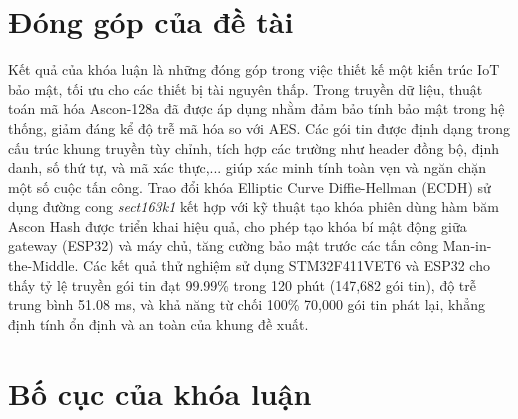 \section{Đóng góp của đề tài}
Kết quả của khóa luận là những đóng góp trong việc thiết kế một kiến trúc IoT bảo mật, tối ưu cho các thiết bị tài nguyên thấp. Trong truyền dữ liệu, thuật toán mã hóa Ascon-128a đã được áp dụng nhằm đảm bảo tính bảo mật trong hệ thống, giảm đáng kể độ trễ mã hóa so với AES. Các gói tin được định dạng trong cấu trúc khung truyền tùy chỉnh, tích hợp các trường như header đồng bộ, định danh, số thứ tự, và mã xác thực,... giúp xác minh tính toàn vẹn và ngăn chặn một số cuộc tấn công. Trao đổi khóa Elliptic Curve Diffie-Hellman (ECDH) sử dụng đường cong \textit{sect163k1} kết hợp với kỹ thuật tạo khóa phiên dùng hàm băm Ascon Hash được triển khai hiệu quả, cho phép tạo khóa bí mật động giữa gateway (ESP32) và máy chủ, tăng cường bảo mật trước các tấn công Man-in-the-Middle. Các kết quả thử nghiệm sử dụng STM32F411VET6 và ESP32 cho thấy tỷ lệ truyền gói tin đạt 99.99\% trong 120 phút (147,682 gói tin), độ trễ trung bình 51.08 ms, và khả năng từ chối 100\% 70,000 gói tin phát lại, khẳng định tính ổn định và an toàn của khung đề xuất. 

\section{Bố cục của khóa luận}



